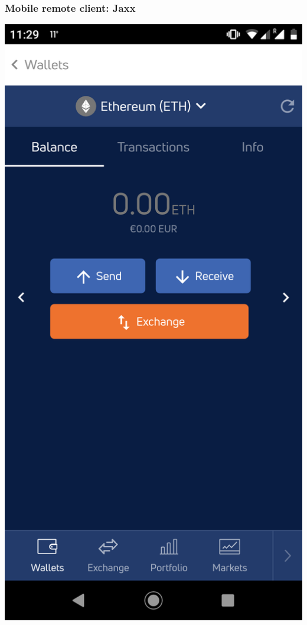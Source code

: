 \documentclass[11pt]{beamer}  %
\begin{document}
\begin{frame}\frametitle{Mobile remote client: Jaxx}

  \begin{center}
    \includegraphics[scale=0.1,clip=false]{pictures/jaxx.png}
  \end{center}

\end{frame}
\end{document}
